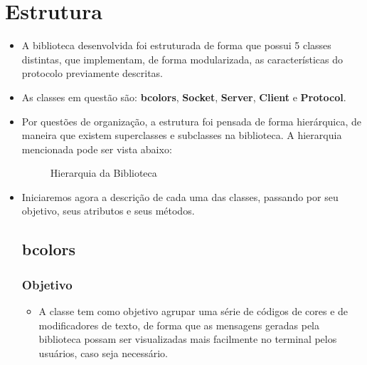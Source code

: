 \documentclass[10pt]{article}
\begin{document}
\section{Estrutura}
    \begin{itemize}
    \item A biblioteca desenvolvida foi estruturada de forma que possui 5 classes distintas, que implementam, de forma modularizada, as características do protocolo previamente descritas. 
    \item As classes em questão são: \textbf{bcolors}, \textbf{Socket}, \textbf{Server}, \textbf{Client} e \textbf{Protocol}.
    \item Por questões de organização, a estrutura foi pensada de forma hierárquica, de maneira que existem superclasses e subclasses na biblioteca. A hierarquia mencionada pode ser vista abaixo:
    
    \begin{figure}[ht]
    \caption{Hierarquia da Biblioteca}
    \label{fig:diagrama}
    \end{figure}
    
    \item Iniciaremos agora a descrição de cada uma das classes, passando por seu objetivo, seus atributos e seus métodos.

    \subsection{\Large bcolors}
        \subsubsection{\large Objetivo}
            \begin{itemize}
            \item A classe tem como objetivo agrupar uma série de códigos de cores e de modificadores de
            texto, de forma que as mensagens geradas pela biblioteca possam ser visualizadas mais
            facilmente no terminal pelos usuários, caso seja necessário.
            \end{itemize}

\end{itemize}
\end{document}
